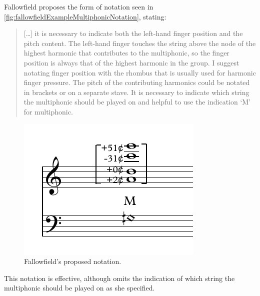 Fallowfield proposes the form of notation seen in \autoref{fig:fallowfieldExampleMultiphonicNotation}, stating:
\begin{quotation}
  [\ldots] it is necessary to indicate both the left-hand finger position and the pitch content. 
  The left-hand finger touches the string above the node of the highest harmonic that contributes to the multiphonic, so the finger position is always that of the highest harmonic in the group. 
  I suggest notating finger position with the rhombus that is usually used for harmonic finger pressure. 
  The pitch of the contributing harmonics could be notated in brackets or on a separate stave. 
  It is necessary to indicate which string the multiphonic should be played on and helpful to use the indication ‘M’ for multiphonic.\autocite[http://www.cellomap.com/index/the-string/multiphonics-and-other-multiple-sounds.html]{fallowfieldCelloMap}
\end{quotation}

\begin{figure}
  \centering
      \includegraphics{./resources/fallowfieldExampleMultiphonicNotation.pdf}
      \caption{Fallowfield's proposed notation.}\label{fig:fallowfieldExampleMultiphonicNotation}\end{figure}

This notation is effective, although omits the indication of which string the multiphonic should be played on as she specified.


